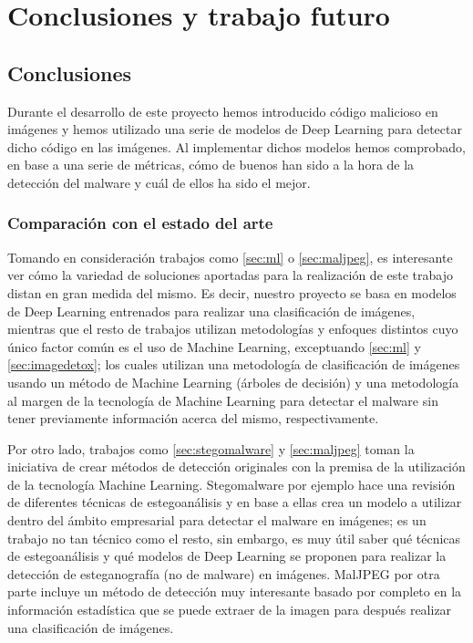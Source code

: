 \chapter{Conclusiones y trabajo futuro}
\label{ch:conc}

\section{Conclusiones}

Durante el desarrollo de este proyecto hemos introducido código malicioso en imágenes y hemos utilizado una serie de modelos de Deep Learning para detectar dicho código en las imágenes. Al implementar dichos modelos hemos comprobado, en base a una serie de métricas, cómo de buenos han sido a la hora de la detección del malware y cuál de ellos ha sido el mejor.

\subsection{Comparación con el estado del arte}

Tomando en consideración trabajos como \ref{sec:ml} o \ref{sec:maljpeg}, es interesante ver cómo la variedad de soluciones aportadas para la realización de este trabajo distan en gran medida del mismo. Es decir, nuestro proyecto se basa en modelos de Deep Learning entrenados para realizar una clasificación de imágenes, mientras que el resto de trabajos utilizan metodologías y enfoques distintos cuyo único factor común es el uso de Machine Learning, exceptuando \ref{sec:ml} y \ref{sec:imagedetox}; los cuales utilizan una metodología de clasificación de imágenes usando un método de Machine Learning (árboles de decisión) y una metodología al margen de la tecnología de Machine Learning para detectar el malware sin tener previamente información acerca del mismo, respectivamente.

Por otro lado, trabajos como \ref{sec:stegomalware} y \ref{sec:maljpeg} toman la iniciativa de crear métodos de detección originales con la premisa de la utilización de la tecnología Machine Learning. Stegomalware por ejemplo hace una revisión de diferentes técnicas de estegoanálisis y en base a ellas crea un modelo a utilizar dentro del ámbito empresarial para detectar el malware en imágenes; es un trabajo no tan técnico como el resto, sin embargo, es muy útil saber qué técnicas de estegoanálisis y qué modelos de Deep Learning se proponen para realizar la detección de esteganografía (no de malware) en imágenes. MalJPEG por otra parte incluye un método de detección muy interesante basado por completo en la información estadística que se puede extraer de la imagen para después realizar una clasificación de imágenes.

